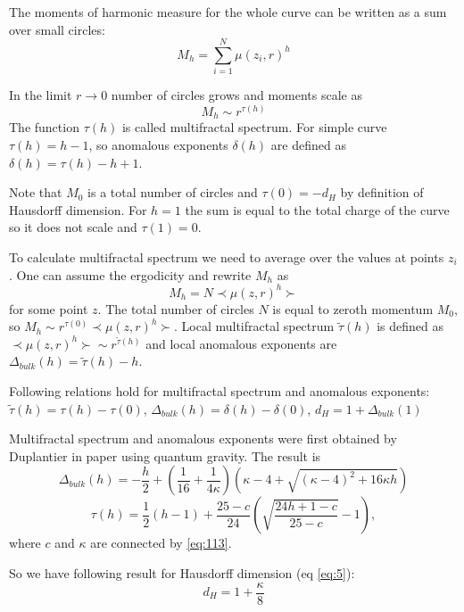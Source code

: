 \documentclass[12pt]{article}
\begin{document}
The moments of harmonic measure for the whole curve can be written as a sum over small circles:
\begin{equation}
  \label{eq:120}
  M_{h}=\sum_{i=1}^{N} \mu(z_{i},r)^{h}
\end{equation}

In the limit $r\to 0$ number of circles grows and moments scale as
\begin{equation}
  \label{eq:121}
  M_{h}\sim r^{\tau(h)}
\end{equation}
The function $\tau(h)$ is called multifractal spectrum. For simple curve $\tau(h)=h-1$, so anomalous
exponents $\delta(h)$ are defined as $\delta(h)=\tau(h)-h+1$. 

Note that $M_{0}$ is a total number of circles and $\tau(0)=-d_{H}$ by definition of Hausdorff
dimension. For $h=1$ the sum is equal to the total charge of the curve so it does not scale and
$\tau(1)=0$. 

To calculate multifractal spectrum we need to average over the values at points $z_{i}$. One can
assume the ergodicity and rewrite $M_{h}$ as
\begin{equation}
  \label{eq:122}
  M_{h}=N \prec \mu(z,r)^{h}\succ
\end{equation}
for some point $z$. The total number of circles $N$ is equal to zeroth momentum $M_{0}$, so
$M_{h}\sim r^{\tau(0)} \prec \mu(z,r)^{h}\succ$. Local multifractal spectrum $\tilde\tau(h)$ is
defined as $ \prec \mu(z,r)^{h}\succ\sim r^{\tilde\tau(h)}$ and local anomalous exponents are
$\Delta_{bulk}(h)=\tilde\tau(h) -h$.

Following relations hold for multifractal spectrum and anomalous exponents:
$\tilde\tau(h)=\tau(h)-\tau(0)$, $\Delta_{bulk}(h)=\delta(h)-\delta(0)$, $d_{H}=1+\Delta_{bulk}(1)$

Multifractal spectrum and anomalous exponents were first obtained by Duplantier in paper
\cite{duplantier2000conformally} using quantum gravity. The result is
\begin{equation}
  \label{eq:123}
  \Delta_{bulk}(h)=-\frac{h}{2}+\left(\frac{1}{16}+\frac{1}{4\kappa}\right)
  (\kappa-4+\sqrt{(\kappa-4)^{2}+16\kappa h})
\end{equation}
\begin{equation}
  \label{eq:124}
  \tau(h)=\frac{1}{2}(h-1) +\frac{25-c}{24}\left(\sqrt{\frac{24 h +1-c}{25-c}}-1\right), 
\end{equation}
where $c$ and $\kappa$ are connected by \eqref{eq:113}.

So we have following result for Hausdorff dimension (eq \eqref{eq:5}):
\begin{equation}
  \label{eq:125}
  d_{H}=1+\frac{\kappa}{8}
\end{equation}
\end{document}
